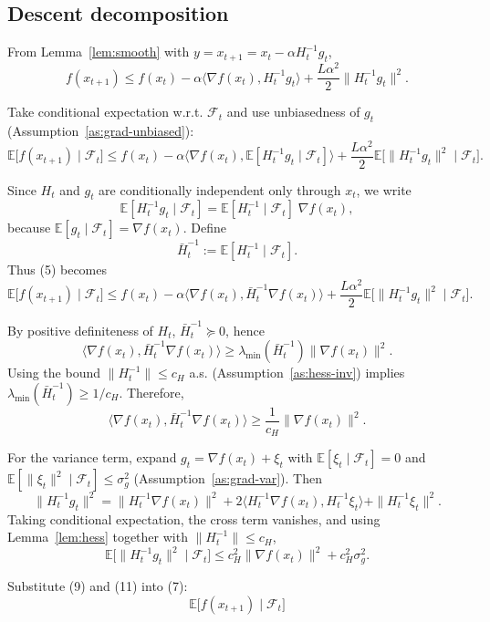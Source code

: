 \documentclass{article}
\newcommand{\E}{\mathbb{E}}
\newcommand{\ip}[2]{\langle #1,#2\rangle}
\begin{document}
\subsection*{Descent decomposition}
\begin{enumerate}[label={[\arabic*]}]
\item From Lemma~\ref{lem:smooth} with $y=x_{t+1}=x_t-\alpha H_t^{-1}g_t$,
\[
f(x_{t+1})\le f(x_t)-\alpha\ip{\nabla f(x_t)}{H_t^{-1}g_t}
       +\frac{L\alpha^2}{2}\|H_t^{-1}g_t\|^2.
\tag{4}
\]
\item Take conditional expectation w.r.t. $\mathcal{F}_t$ and use unbiasedness of $g_t$ (Assumption~\ref{as:grad-unbiased}):
\[
\E\big[f(x_{t+1})\mid\mathcal{F}_t\big]
\le f(x_t)-\alpha\ip{\nabla f(x_t)}{ \E[H_t^{-1}g_t\mid\mathcal{F}_t] }
   +\frac{L\alpha^2}{2}\E\!\big[\|H_t^{-1}g_t\|^2\mid\mathcal{F}_t\big].
\tag{5}
\]
\item Since $H_t$ and $g_t$ are conditionally independent only through $x_t$, we write
\[
\E[H_t^{-1}g_t\mid\mathcal{F}_t]
   =\E[H_t^{-1}\mid\mathcal{F}_t]\;\nabla f(x_t),
\]
because $\E[g_t\mid\mathcal{F}_t]=\nabla f(x_t)$. Define 
\[
\bar H_t^{-1}:=\E[H_t^{-1}\mid\mathcal{F}_t].
\tag{6}
\]
Thus (5) becomes
\[
\E\big[f(x_{t+1})\mid\mathcal{F}_t\big]
\le f(x_t)-\alpha\ip{\nabla f(x_t)}{\bar H_t^{-1}\nabla f(x_t)}
   +\frac{L\alpha^2}{2}\E\!\big[\|H_t^{-1}g_t\|^2\mid\mathcal{F}_t\big].
\tag{7}
\]
\item By positive definiteness of $H_t$, $\bar H_t^{-1}\succeq 0$, hence
\[
\ip{\nabla f(x_t)}{\bar H_t^{-1}\nabla f(x_t)}
   \ge \lambda_{\min}(\bar H_t^{-1})\|\nabla f(x_t)\|^2.
\tag{8}
\]
Using the bound $\|H_t^{-1}\|\le c_H$ a.s. (Assumption~\ref{as:hess-inv}) implies $\lambda_{\min}(\bar H_t^{-1})\ge 1/c_H$.
Therefore,
\[
\ip{\nabla f(x_t)}{\bar H_t^{-1}\nabla f(x_t)}
   \ge \frac{1}{c_H}\|\nabla f(x_t)\|^2.
\tag{9}
\]
\item For the variance term, expand $g_t=\nabla f(x_t)+\xi_t$ with $\E[\xi_t\mid\mathcal{F}_t]=0$ and $\E[\|\xi_t\|^2\mid\mathcal{F}_t]\le\sigma_g^2$ (Assumption~\ref{as:grad-var}). Then
\[
\|H_t^{-1}g_t\|^2
   =\|H_t^{-1}\nabla f(x_t)\|^2
     +2\ip{H_t^{-1}\nabla f(x_t)}{H_t^{-1}\xi_t}
     +\|H_t^{-1}\xi_t\|^2.
\tag{10}
\]
Taking conditional expectation, the cross term vanishes, and using Lemma~\ref{lem:hess} together with $\|H_t^{-1}\|\le c_H$,
\[
\E\!\big[\|H_t^{-1}g_t\|^2\mid\mathcal{F}_t\big]
   \le c_H^2\|\nabla f(x_t)\|^2 + c_H^2\sigma_g^2.
\tag{11}
\]
\item Substitute (9) and (11) into (7):
\[
\E\big[f(x_{t+1})\mid\mathcal{F}_t\big]
\]
\end{enumerate}
\end{document}
